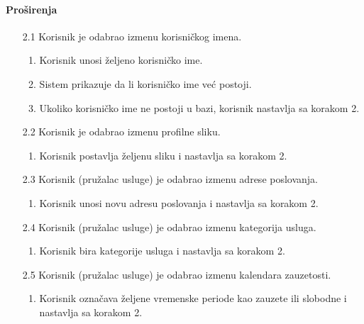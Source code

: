 \documentclass[a4paper,12pt]{report}
\begin{document}
    \paragraph*{Proširenja} 
    \begin{enumerate}
        \item[2.1] Korisnik je odabrao izmenu korisničkog imena.
        \begin{enumerate}[noitemsep,topsep=-8pt]
            \item Korisnik unosi željeno korisničko ime.
            \item Sistem prikazuje da li korisničko ime već postoji.
            \item Ukoliko korisničko ime ne postoji u bazi, korisnik nastavlja sa korakom 2.
        \end{enumerate}
    
        \item[2.2] Korisnik je odabrao izmenu profilne sliku.
        \begin{enumerate}[noitemsep,topsep=-8pt]
             \item Korisnik postavlja željenu sliku i nastavlja sa korakom 2.
        \end{enumerate}
        
        \item[2.3] Korisnik (pružalac usluge) je odabrao izmenu adrese poslovanja.
        \begin{enumerate}[noitemsep,topsep=-8pt]
        \item Korisnik unosi novu adresu poslovanja i nastavlja sa korakom 2.
        \end{enumerate}
    
        \item[2.4] Korisnik (pružalac usluge) je odabrao izmenu kategorija usluga.
        \begin{enumerate}[noitemsep,topsep=-8pt]
            \item Korisnik bira kategorije usluga i nastavlja sa korakom 2.
        \end{enumerate}
        
        \item[2.5] Korisnik (pružalac usluge) je odabrao izmenu kalendara zauzetosti.
        \begin{enumerate}[noitemsep,topsep=-8pt]
            \item Korisnik označava željene vremenske periode kao zauzete ili slobodne i nastavlja sa korakom 2.
        \end{enumerate}
   

\end{enumerate}
\end{document}

